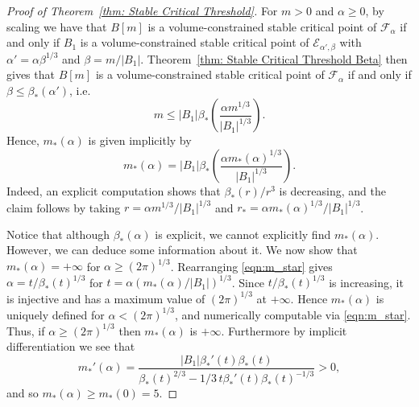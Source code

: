 \documentclass[a4paper,11pt,reqno]{amsart}
\numberwithin{equation}{section}
\theoremstyle{remark}
\theoremstyle{definition}
\newcommand{\enf}{\mathcal{F}_{\alpha}}
\renewcommand{\leq}{\leqslant}
\renewcommand{\geq}{\geqslant}
\newcommand{\calE}{\mathcal{E}}
\begin{document}
\begin{proof}[Proof of Theorem~\ref{thm: Stable Critical Threshold}] For $m>0$ and $\alpha \geq 0$, by scaling we have that $B[m]$ is a volume-constrained stable critical point of $\enf$ if and only if $B_1$ is a volume-constrained stable critical point of $\calE_{\alpha', \beta}$ with $\alpha'=\alpha \beta^{1/3}$ and $\beta=m/|B_1|$. Theorem~\ref{thm: Stable Critical Threshold Beta} then gives that $B[m]$ is a volume-constrained stable critical point of $\enf$ if and only if $\beta \leq \beta_*(\alpha')$, i.e.
	\[
		m\leq |B_1|\beta_*\left(\frac{\alpha m^{1/3}}{|B_1|^{1/3}}\right).
	\]
Hence, $m_*(\alpha)$ is given implicitly by
	\begin{equation}\label{eqn:m_star}
		m_*(\alpha) = |B_1|\beta_*\left(\frac{\alpha m_*(\alpha)^{1/3}}{|B_1|^{1/3}}\right).
	\end{equation}
Indeed, an explicit computation shows that $\beta_*(r)/r^3$ is decreasing, and the claim follows by taking $r=\alpha m^{1/3}/|B_1|^{1/3}$ and $r_*=\alpha m_*(\alpha)^{1/3}/|B_1|^{1/3}$. 

Notice that although $\beta_*(\alpha)$ is explicit, we cannot explicitly find $m_*(\alpha)$. However, we can deduce some information about it. We now show that $m_*(\alpha)=+\infty$ for $\alpha \geq (2\pi)^{1/3}$. Rearranging \eqref{eqn:m_star} gives $\alpha = t/\beta_*(t)^{1/3}$ for $t=\alpha (m_*(\alpha)/|B_1|)^{1/3}$. Since $t/\beta_*(t)^{1/3}$ is increasing, it is injective and has a maximum value of $(2\pi)^{1/3}$ at $+\infty$. Hence $m_*(\alpha)$ is uniquely defined for $\alpha<(2\pi)^{1/3}$, and numerically computable via \eqref{eqn:m_star}. Thus, if $\alpha \geq (2\pi)^{1/3}$ then $m_*(\alpha)$ is $+\infty$. Furthermore by implicit differentiation we see that
	\[
	m_*'(\alpha) = \frac{|B_1|\beta_*'(t)\beta_*(t)}{\beta_*(t)^{2/3}-1/3\,t\beta_*'(t)\beta_*(t)^{-1/3}}>0,
	\]
and so $m_*(\alpha)\geq m_*(0)=5$. 
\end{proof}
\end{document}
